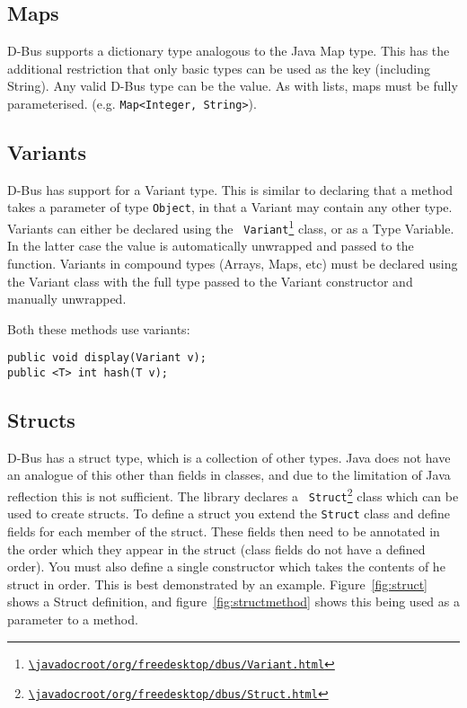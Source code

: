 \documentclass[a4paper,12pt]{article}
\begin{document}
\subsection{Maps}

D-Bus supports a dictionary type analogous to the Java Map type. This
has the additional restriction that only basic types can be used as
the key (including String). Any valid D-Bus type can be the value. As
with lists, maps must be fully parameterised. (e.g.
\verb&Map<Integer, String>&).

\subsection{Variants}

D-Bus has support for a Variant type. This is similar to declaring that a
method takes a parameter of type {\tt Object}, in that a Variant may contain
any other type. Variants can either be declared using the {\tt
Variant\footnote{\url{\javadocroot/org/freedesktop/dbus/Variant.html}}} class, or as
a Type Variable. In the latter case the value is automatically unwrapped and
passed to the function. Variants in compound types (Arrays, Maps, etc) must be
declared using the Variant class with the full type passed to the Variant
constructor and manually unwrapped.

Both these methods use variants:

\begin{verbatim}
public void display(Variant v);
public <T> int hash(T v);
\end{verbatim}

\subsection{Structs}

D-Bus has a struct type, which is a collection of other types. Java
does not have an analogue of this other than fields in classes, and
due to the limitation of Java reflection this is not sufficient. The
library declares a {\tt
Struct\footnote{\url{\javadocroot/org/freedesktop/dbus/Struct.html}}} class which can be used to create structs.
To define a struct you extend the {\tt Struct} class and define fields for each member of the struct.
These fields then need to be annotated in the order which they appear in the struct (class fields do not have a defined order). You must also define a single constructor which takes the contents of he struct in order. This is best demonstrated by an example.
Figure~\ref{fig:struct} shows a Struct definition, and
figure~\ref{fig:structmethod} shows this being used as a parameter
to a method.
\end{document}
